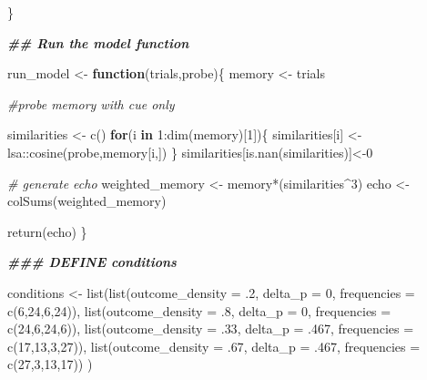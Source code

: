 \documentclass[
  english,
  man,floatsintext]{apa6}
\newenvironment{Shaded}{\begin{snugshade}}{\end{snugshade}}
\newcommand{\DecValTok}[1]{\textcolor[rgb]{0.00,0.00,0.81}{#1}}
\newcommand{\SpecialCharTok}[1]{\textcolor[rgb]{0.00,0.00,0.00}{#1}}
\newcommand{\CommentTok}[1]{\textcolor[rgb]{0.56,0.35,0.01}{\textit{#1}}}
\newcommand{\DocumentationTok}[1]{\textcolor[rgb]{0.56,0.35,0.01}{\textbf{\textit{#1}}}}
\newcommand{\OtherTok}[1]{\textcolor[rgb]{0.56,0.35,0.01}{#1}}
\newcommand{\FunctionTok}[1]{\textcolor[rgb]{0.00,0.00,0.00}{#1}}
\newcommand{\ControlFlowTok}[1]{\textcolor[rgb]{0.13,0.29,0.53}{\textbf{#1}}}
\newcommand{\AttributeTok}[1]{\textcolor[rgb]{0.77,0.63,0.00}{#1}}
\newcommand{\NormalTok}[1]{#1}
\begin{document}
\begin{appendix}
\begin{Shaded}
\begin{Highlighting}[]
\NormalTok{\}}

\DocumentationTok{\#\# Run the model function}

\NormalTok{run\_model }\OtherTok{\textless{}{-}} \ControlFlowTok{function}\NormalTok{(trials,probe)\{}
\NormalTok{  memory }\OtherTok{\textless{}{-}}\NormalTok{ trials}

\CommentTok{\#probe memory with cue only}

\NormalTok{  similarities }\OtherTok{\textless{}{-}} \FunctionTok{c}\NormalTok{()}
\ControlFlowTok{for}\NormalTok{(i }\ControlFlowTok{in} \DecValTok{1}\SpecialCharTok{:}\FunctionTok{dim}\NormalTok{(memory)[}\DecValTok{1}\NormalTok{])\{}
\NormalTok{    similarities[i] }\OtherTok{\textless{}{-}}\NormalTok{ lsa}\SpecialCharTok{::}\FunctionTok{cosine}\NormalTok{(probe,memory[i,])}
\NormalTok{  \}}
\NormalTok{  similarities[}\FunctionTok{is.nan}\NormalTok{(similarities)]}\OtherTok{\textless{}{-}}\DecValTok{0}

\CommentTok{\# generate echo}
\NormalTok{  weighted\_memory }\OtherTok{\textless{}{-}}\NormalTok{ memory}\SpecialCharTok{*}\NormalTok{(similarities}\SpecialCharTok{\^{}}\DecValTok{3}\NormalTok{)}
\NormalTok{  echo }\OtherTok{\textless{}{-}} \FunctionTok{colSums}\NormalTok{(weighted\_memory)}

\FunctionTok{return}\NormalTok{(echo)}
\NormalTok{\}}

\DocumentationTok{\#\#\# DEFINE conditions}

\NormalTok{conditions }\OtherTok{\textless{}{-}} \FunctionTok{list}\NormalTok{(}\FunctionTok{list}\NormalTok{(}\AttributeTok{outcome\_density =}\NormalTok{ .}\DecValTok{2}\NormalTok{,}
\AttributeTok{delta\_p =} \DecValTok{0}\NormalTok{,}
\AttributeTok{frequencies =} \FunctionTok{c}\NormalTok{(}\DecValTok{6}\NormalTok{,}\DecValTok{24}\NormalTok{,}\DecValTok{6}\NormalTok{,}\DecValTok{24}\NormalTok{)),}
\FunctionTok{list}\NormalTok{(}\AttributeTok{outcome\_density =}\NormalTok{ .}\DecValTok{8}\NormalTok{,}
\AttributeTok{delta\_p =} \DecValTok{0}\NormalTok{,}
\AttributeTok{frequencies =} \FunctionTok{c}\NormalTok{(}\DecValTok{24}\NormalTok{,}\DecValTok{6}\NormalTok{,}\DecValTok{24}\NormalTok{,}\DecValTok{6}\NormalTok{)),}
\FunctionTok{list}\NormalTok{(}\AttributeTok{outcome\_density =}\NormalTok{ .}\DecValTok{33}\NormalTok{,}
\AttributeTok{delta\_p =}\NormalTok{ .}\DecValTok{467}\NormalTok{,}
\AttributeTok{frequencies =} \FunctionTok{c}\NormalTok{(}\DecValTok{17}\NormalTok{,}\DecValTok{13}\NormalTok{,}\DecValTok{3}\NormalTok{,}\DecValTok{27}\NormalTok{)),}
\FunctionTok{list}\NormalTok{(}\AttributeTok{outcome\_density =}\NormalTok{ .}\DecValTok{67}\NormalTok{,}
\AttributeTok{delta\_p =}\NormalTok{ .}\DecValTok{467}\NormalTok{,}
\AttributeTok{frequencies =} \FunctionTok{c}\NormalTok{(}\DecValTok{27}\NormalTok{,}\DecValTok{3}\NormalTok{,}\DecValTok{13}\NormalTok{,}\DecValTok{17}\NormalTok{))}
\NormalTok{                   )}


\end{Highlighting}
\end{Shaded}
\end{appendix}
\end{document}
